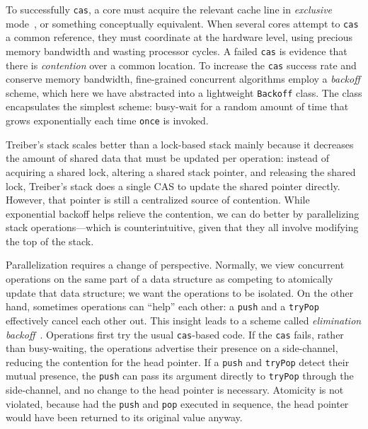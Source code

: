 \documentclass[preprint,nocopyrightspace]{sigplanconf}
\begin{document}
To successfully \lstinline{cas}, a core must acquire the relevant cache line in
\emph{exclusive} mode~\cite{?}, or something conceptually equivalent.  When
several cores attempt to \lstinline{cas} a common reference, they must
coordinate at the hardware level, using precious memory bandwidth and wasting
processor cycles.  A failed \lstinline{cas} is evidence that there is
\emph{contention} over a common location.  To increase the \lstinline{cas}
success rate and conserve memory bandwidth, fine-grained concurrent algorithms
employ a \emph{backoff} scheme, which here we have abstracted into a lightweight
\lstinline{Backoff} class.  The class encapsulates the simplest scheme:
busy-wait for a random amount of time that grows exponentially each time
\lstinline{once} is invoked.  



Treiber's stack scales better than a lock-based stack mainly because it
decreases the amount of shared data that must be updated per operation: instead
of acquiring a shared lock, altering a shared stack pointer, and releasing the
shared lock, Treiber's stack does a single CAS to update the shared pointer
directly.  However, that pointer is still a centralized source of contention.
While exponential backoff helps relieve the contention, we can do better by
parallelizing stack operations---which is counterintuitive, given that they all
involve modifying the top of the stack.

Parallelization requires a change of perspective.  Normally, we view concurrent
operations on the same part of a data structure as competing to atomically
update that data structure; we want the operations to be isolated.  On the other
hand, sometimes operations can ``help'' each other: a \lstinline{push} and a
\lstinline{tryPop} effectively cancel each other out.  This insight leads to a
scheme called \emph{elimination backoff}~\cite{Shavit1997a,Hendler2004}.
Operations first try the usual \lstinline{cas}-based code.  If the
\lstinline{cas} fails, rather than busy-waiting, the operations advertise their
presence on a side-channel, reducing the contention for the head pointer.  If a
\lstinline{push} and \lstinline{tryPop} detect their mutual presence, the
\lstinline{push} can pass its argument directly to \lstinline{tryPop} through
the side-channel, and no change to the head pointer is necessary.  Atomicity is
not violated, because had the \lstinline{push} and \lstinline{pop} executed in
sequence, the head pointer would have been returned to its original value
anyway.
\end{document}
